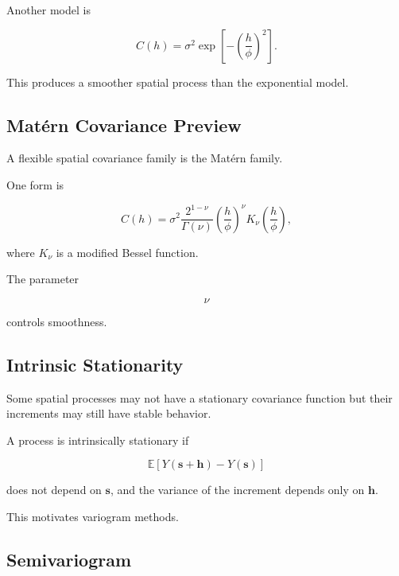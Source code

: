 Another model is

\[
\boxed{
C(h)
=
\sigma^2
\exp
\left[
-
\left(
\frac{h}{\phi}
\right)^2
\right].
}
\]

This produces a smoother spatial process than the exponential model.

\subsection{Matérn Covariance Preview}
\label{subsec:matern-covariance-preview}

A flexible spatial covariance family is the Matérn family.

One form is

\[
\boxed{
C(h)
=
\sigma^2
\frac{
2^{1-\nu}
}{
\Gamma(\nu)
}
\left(
\frac{h}{\phi}
\right)^\nu
K_\nu
\left(
\frac{h}{\phi}
\right),
}
\]

where \(K_\nu\) is a modified Bessel function.

The parameter

\[
\nu
\]

controls smoothness.

\subsection{Intrinsic Stationarity}
\label{subsec:intrinsic-stationarity}

Some spatial processes may not have a stationary covariance function but
their increments may still have stable behavior.

A process is intrinsically stationary if

\[
\boxed{
\mathbb{E}
[
Y(\mathbf{s}+\mathbf{h})
-
Y(\mathbf{s})
]
}
\]

does not depend on \(\mathbf{s}\), and the variance of the increment
depends only on \(\mathbf{h}\).

This motivates variogram methods.

\subsection{Semivariogram}
\label{subsec:semivariogram}

